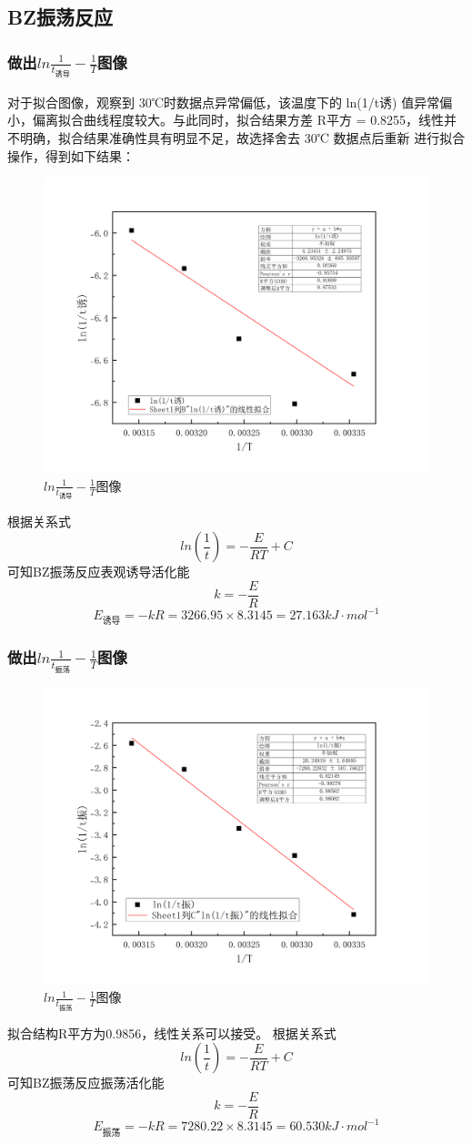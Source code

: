 \documentclass[12pt,hyperref,a4paper,UTF8]{ctexart}
\begin{document}
\subsection{BZ振荡反应}
\subsubsection{做出$ln{\frac{1}{t_{\text{诱导}}}}-\frac{1}{T}$图像}
对于拟合图像，观察到 30℃时数据点异常偏低，该温度下的 ln(1/t诱) 值异常偏
小，偏离拟合曲线程度较大。与此同时，拟合结果方差 R平方 = 0.8255，线性并不明确，拟合结果准确性具有明显不足，故选择舍去 30℃ 数据点后重新
进行拟合操作，得到如下结果：
\begin{figure}[H]
	\centering
	\includegraphics[width=0.6\linewidth]{f1.png}
	\caption{$ln{\frac{1}{t_{\text{诱导}}}}-\frac{1}{T}$图像}
	\label{fig:example}
\end{figure}
根据关系式 
\begin{equation}
	ln(\frac{1}{t}) = -\frac{E}{RT} + C
\end{equation}
可知BZ振荡反应表观诱导活化能
\[
	k = -\frac{E}{R}
\]
\[	
	E_{\text{诱导}} = -kR = 3266.95 \times 8.3145 = 27.163kJ \cdot mol^{-1}
\]

\subsubsection{做出$ln{\frac{1}{t_{\text{振荡}}}}-\frac{1}{T}$图像}
\begin{figure}[H]
	\centering
	\includegraphics[width=0.6\linewidth]{f2.png}
	\caption{$ln{\frac{1}{t_{\text{振荡}}}}-\frac{1}{T}$图像}
	\label{fig:example}
\end{figure}
拟合结构R平方为0.9856，线性关系可以接受。
根据关系式 
\begin{equation}
	ln(\frac{1}{t}) = -\frac{E}{RT} + C
\end{equation}
可知BZ振荡反应振荡活化能
\[
k = -\frac{E}{R}
\]
\[	
E_{\text{振荡}} = -kR = 7280.22 \times 8.3145 = 60.530kJ \cdot mol^{-1}
\]
\end{document}
